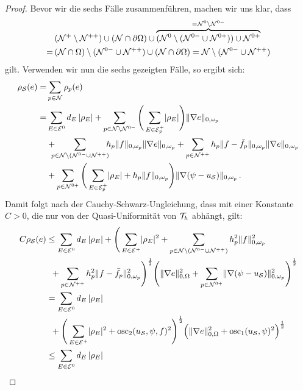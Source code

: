\begin{proof}
Bevor wir die sechs Fälle zusammenführen, machen wir uns klar, dass 
\begin{align*}
	 & (\mathcal N^+\setminus \mathcal N^{++})  \cup (\mathcal N\cap \partial \Omega)  \cup \overbrace{(\mathcal N^0 \setminus (\mathcal N^{0-} \cup \mathcal N^{0+}))  \cup\mathcal N^{0+}}^{=\mathcal N^0\setminus \mathcal N^{0-}} \\
	 = \, & (\mathcal N\cap \Omega) \setminus (\mathcal N^{0-}\cup \mathcal N^{++})\cup (\mathcal N \cap \partial \Omega) = \mathcal N \setminus (\mathcal N^{0-} \cup \mathcal N^{++}) 
\end{align*}
gilt. Verwenden wir nun die sechs gezeigten Fälle, so ergibt sich:
\begin{align*}
	\rho_{\mathcal S}(e) = & \sum_{p \in \mathcal N} \rho_p(e) \\
	= & \sum_{E\in \mathcal E^0} d_E\, \lvert \rho_E\rvert 
		+ \sum_{p \in \mathcal N \setminus \mathcal N^{0-}} \Bigg( \sum_{E \in \mathcal E_p^+} \lvert \rho_E\rvert \Bigg) \lVert \nabla e\rVert_{0,\omega_p} \\
	 & + \! \! \!\! \sum_{p \in \mathcal N\setminus(\mathcal N^{0-}\cup\mathcal N^{++})}\!\!\! h_p \lVert f\rVert_{0,\omega_p} \lVert \nabla e\rVert_{0,\omega_p} + \sum_{p \in \mathcal N^{++}} h_p \lVert f-\bar f_p\rVert_{0,\omega_p} \lVert \nabla e\rVert_{0,\omega_p} \\
	 & + \sum_{p \in \mathcal N^{0+}} \Bigg(\sum_{E\in \mathcal E^+_p} \lvert \rho_E\rvert + h_p \lVert f\rVert_{0,\omega_p}\Bigg) \lVert \nabla(\psi-u_{\mathcal S})\rVert_{0,\omega_p}  \, .
\end{align*}
Damit folgt nach der Cauchy-Schwarz-Ungleichung, dass mit einer Konstante $C>0$, die nur von der Quasi-Uniformität von $\mathcal T_h$ abhängt, gilt:
\begin{align*}
	C \rho_{\mcal S}(e) & \le  \sum_{E\in \mcal E^0} d_E\, \abs{\rho_E} + \Bigg(\sum_{E\in \mcal E^+} \abs{\rho_E}^2 + \sum_{p \in \mcal N\setminus(\mcal N^{0-}\cup\mcal N^{++})} h_p^2 \norm{f}^2_{0,\omega_p}  \\
	&\ \,  +  \sum_{p \in \mcal N^{++}} h_p^2 \norm{f-\bar f_p}_{0,\omega_p}^2\Bigg)^{\frac 12} \Bigg( \norm{\nabla e}^2_{0,\Omega} + \sum_{p \in \mcal N^{0+}} \norm{\nabla(\psi-u_{\mcal S})}_{0,\omega_p}^2 \Bigg)^{\frac 1 2} \\
	& =   \sum_{E\in \mcal E^0} d_E\, \abs{\rho_E} \\
	&\ \, + \Bigg(\sum_{E\in \mcal E^+} \abs{\rho_E}^2  + \osc_2(u_{\mcal S},\psi,f)^2\Bigg)^{\frac 12} \Big( \norm{\nabla e}^2_{0,\Omega} + \osc_1(u_{\mcal S},\psi)^2 \Big)^{\frac 1 2} \\
	& \le\sum_{E\in \mcal E^0} d_E\, \abs{\rho_E}  \\

\end{align*}
\end{proof}
